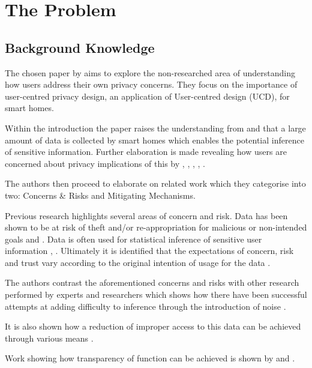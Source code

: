 \section{The Problem}

\subsection{Background Knowledge}

The chosen paper by \textcite{Yao:2019:DMC:3290605.3300428} aims to explore the non-researched area of understanding how users address their own privacy concerns. They focus on the importance of user-centred privacy design, an application of User-centred design (UCD), for smart homes. 


Within the introduction the paper raises the understanding from \textcite{9} and \textcite{28} that a large amount of data is collected by smart homes which enables the potential inference of sensitive information. Further elaboration is made revealing how users are concerned about privacy implications of this by \textcite{6}, \textcite{40}, \textcite{42}, \textcite{18}, \textcite{21}.

The authors then proceed to elaborate on related work which they categorise into two: Concerns \& Risks and Mitigating Mechanisms.

Previous research highlights several areas of concern and risk.
Data has been shown to be at risk of theft and/or re-appropriation for malicious or non-intended goals \parencite{3} \parencite{1} and \parencite{2}. Data is often used for statistical inference of sensitive user information \parencite{45}, \parencite{6} \parencite{42}. Ultimately it is identified that the expectations of concern, risk and trust vary according to the original intention of usage for the data \parencite{40} \parencite{43}.

The authors contrast the aforementioned concerns and risks with other research performed by experts and researchers which shows how there have been successful attempts at adding difficulty to inference through the introduction of noise \parencite{2} \parencite{11} \parencite{41} \parencite{39}.

It is also shown how a reduction of improper access to this data can be achieved through various means \parencite{29} \parencite{3} \parencite{8}.

Work showing how transparency of function can be achieved is shown by \textcite{10} and \textcite{26}.

